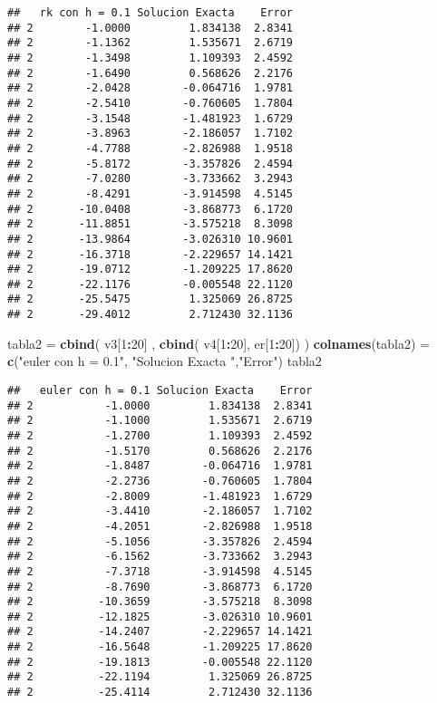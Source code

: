 \documentclass[]{article}
\newenvironment{Shaded}{\begin{snugshade}}{\end{snugshade}}
\newcommand{\KeywordTok}[1]{\textcolor[rgb]{0.13,0.29,0.53}{\textbf{#1}}}
\newcommand{\DecValTok}[1]{\textcolor[rgb]{0.00,0.00,0.81}{#1}}
\newcommand{\StringTok}[1]{\textcolor[rgb]{0.31,0.60,0.02}{#1}}
\newcommand{\OperatorTok}[1]{\textcolor[rgb]{0.81,0.36,0.00}{\textbf{#1}}}
\newcommand{\NormalTok}[1]{#1}
\begin{document}
\begin{verbatim}
##   rk con h = 0.1 Solucion Exacta    Error
## 2        -1.0000         1.834138  2.8341
## 2        -1.1362         1.535671  2.6719
## 2        -1.3498         1.109393  2.4592
## 2        -1.6490         0.568626  2.2176
## 2        -2.0428        -0.064716  1.9781
## 2        -2.5410        -0.760605  1.7804
## 2        -3.1548        -1.481923  1.6729
## 2        -3.8963        -2.186057  1.7102
## 2        -4.7788        -2.826988  1.9518
## 2        -5.8172        -3.357826  2.4594
## 2        -7.0280        -3.733662  3.2943
## 2        -8.4291        -3.914598  4.5145
## 2       -10.0408        -3.868773  6.1720
## 2       -11.8851        -3.575218  8.3098
## 2       -13.9864        -3.026310 10.9601
## 2       -16.3718        -2.229657 14.1421
## 2       -19.0712        -1.209225 17.8620
## 2       -22.1176        -0.005548 22.1120
## 2       -25.5475         1.325069 26.8725
## 2       -29.4012         2.712430 32.1136
\end{verbatim}

\begin{Shaded}
\begin{Highlighting}[]
\NormalTok{tabla2 =}\StringTok{ }\KeywordTok{cbind}\NormalTok{( v3[}\DecValTok{1}\OperatorTok{:}\DecValTok{20}\NormalTok{] , }\KeywordTok{cbind}\NormalTok{( v4[}\DecValTok{1}\OperatorTok{:}\DecValTok{20}\NormalTok{], er[}\DecValTok{1}\OperatorTok{:}\DecValTok{20}\NormalTok{]) )}
\KeywordTok{colnames}\NormalTok{(tabla2) =}\StringTok{ }\KeywordTok{c}\NormalTok{(}\StringTok{"euler con h = 0.1"}\NormalTok{, }\StringTok{"Solucion Exacta "}\NormalTok{,}\StringTok{"Error"}\NormalTok{)}
\NormalTok{tabla2}
\end{Highlighting}
\end{Shaded}

\begin{verbatim}
##   euler con h = 0.1 Solucion Exacta    Error
## 2           -1.0000         1.834138  2.8341
## 2           -1.1000         1.535671  2.6719
## 2           -1.2700         1.109393  2.4592
## 2           -1.5170         0.568626  2.2176
## 2           -1.8487        -0.064716  1.9781
## 2           -2.2736        -0.760605  1.7804
## 2           -2.8009        -1.481923  1.6729
## 2           -3.4410        -2.186057  1.7102
## 2           -4.2051        -2.826988  1.9518
## 2           -5.1056        -3.357826  2.4594
## 2           -6.1562        -3.733662  3.2943
## 2           -7.3718        -3.914598  4.5145
## 2           -8.7690        -3.868773  6.1720
## 2          -10.3659        -3.575218  8.3098
## 2          -12.1825        -3.026310 10.9601
## 2          -14.2407        -2.229657 14.1421
## 2          -16.5648        -1.209225 17.8620
## 2          -19.1813        -0.005548 22.1120
## 2          -22.1194         1.325069 26.8725
## 2          -25.4114         2.712430 32.1136
\end{verbatim}
\end{document}
